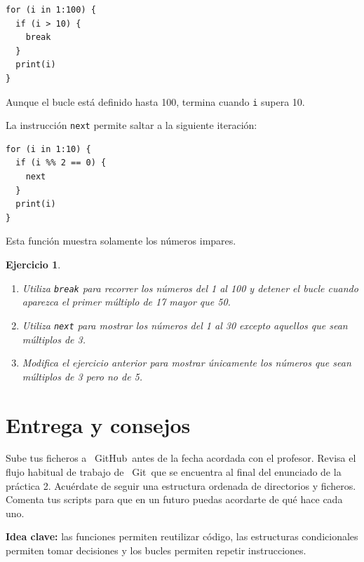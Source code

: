\documentclass[11pt,a4paper]{article}
\newcommand{\Git}{\textcolor{git}{\faIcon{git-alt}}~\!Git}
\newcommand{\GitHub}{\faIcon{github}~\!GitHub}
\theoremstyle{exercise}
\newtheorem{exercise}{Ejercicio}
\begin{document}
\begin{lstlisting}[style=rstyle]
for (i in 1:100) {
  if (i > 10) {
    break
  }
  print(i)
}
\end{lstlisting}

\noindent Aunque el bucle está definido hasta 100, termina cuando \texttt{i} supera 10. 

La instrucción \texttt{next} permite saltar a la siguiente iteración:

\begin{lstlisting}[style=rstyle]
for (i in 1:10) {
  if (i %% 2 == 0) {
    next
  }
  print(i)
}
\end{lstlisting}

\noindent Esta función muestra solamente los números impares.

\begin{exercise}\ 
\begin{enumerate}[label=\alph*)]
  \item Utiliza \texttt{break} para recorrer los números del 1 al 100 y detener el bucle cuando aparezca el primer múltiplo de 17 mayor que 50.
  \item Utiliza \texttt{next} para mostrar los números del 1 al 30 excepto aquellos que sean múltiplos de 3.
  \item Modifica el ejercicio anterior para mostrar únicamente los números que sean múltiplos de 3 pero no de 5.
\end{enumerate}
\end{exercise}


%
\section{Entrega y consejos}


Sube tus ficheros a \GitHub\ antes de la fecha acordada con el profesor. Revisa el flujo habitual de trabajo de \Git\ que se encuentra al final del enunciado de la práctica 2. Acuérdate de seguir una estructura ordenada de directorios y ficheros. Comenta tus scripts para que en un futuro puedas acordarte de qué hace cada uno.

\bigskip


\textbf{\color{azuluc}Idea clave:} las funciones permiten reutilizar código, las estructuras condicionales permiten tomar decisiones y los bucles permiten repetir instrucciones.
\end{document}
